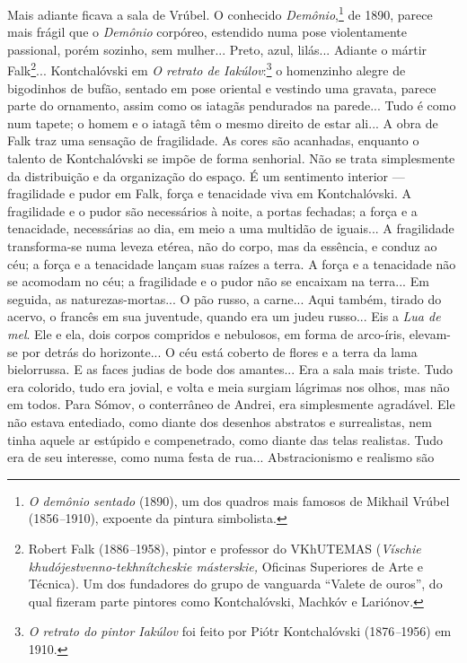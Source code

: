 Mais adiante ficava a sala de Vrúbel. O conhecido
\emph{Demônio},\footnote{\emph{O demônio sentado} (1890), um dos quadros
  mais famosos de Mikhail Vrúbel (1856\emph{--}1910), expoente da
  pintura simbolista.} de 1890, parece mais frágil que o \emph{Demônio}
corpóreo, estendido numa pose violentamente passional, porém sozinho,
sem mulher... Preto, azul, lilás... Adiante o mártir Falk\footnote{Robert
  Falk (1886\emph{--}1958), pintor e professor do VKhUTEMAS
  (\emph{Víschie khudójestvenno-tekhnítcheskie másterskie,} Oficinas
  Superiores de Arte e Técnica). Um dos fundadores do grupo de vanguarda
  ``Valete de ouros'', do qual fizeram parte pintores como
  Kontchalóvski, Machkóv e Lariónov.}... Kontchalóvski em \emph{O
retrato de Iakúlov}:\footnote{\emph{O retrato do pintor Iakúlov} foi
  feito por Piótr Kontchalóvski (1876\emph{--}1956) em 1910.} o
homenzinho alegre de bigodinhos de bufão, sentado em pose oriental e
vestindo uma gravata, parece parte do ornamento, assim como os iatagãs
pendurados na parede... Tudo é como num tapete; o homem e o iatagã têm o
mesmo direito de estar ali... A obra de Falk traz uma sensação de
fragilidade. As cores são acanhadas, enquanto o talento de Kontchalóvski
se impõe de forma senhorial. Não se trata simplesmente da distribuição e
da organização do espaço. É um sentimento interior --- fragilidade e
pudor em Falk, força e tenacidade viva em Kontchalóvski. A fragilidade e
o pudor são necessários à noite, a portas fechadas; a força e a
tenacidade, necessárias ao dia, em meio a uma multidão de iguais... A
fragilidade transforma-se numa leveza etérea, não do corpo, mas da
essência, e conduz ao céu; a força e a tenacidade lançam suas raízes a
terra. A força e a tenacidade não se acomodam no céu; a fragilidade e o
pudor não se encaixam na terra... Em seguida, as naturezas-mortas... O
pão russo, a carne... Aqui também, tirado do acervo, o francês em sua
juventude, quando era um judeu russo... Eis a \emph{Lua de mel}. Ele e
ela, dois corpos compridos e nebulosos, em forma de arco-íris, elevam-se
por detrás do horizonte... O céu está coberto de flores e a terra da
lama bielorrussa. E as faces judias de bode dos amantes... Era a sala
mais triste. Tudo era colorido, tudo era jovial, e volta e meia surgiam
lágrimas nos olhos, mas não em todos. Para Sómov, o conterrâneo de
Andrei, era simplesmente agradável. Ele não estava entediado, como
diante dos desenhos abstratos e surrealistas, nem tinha aquele ar
estúpido e compenetrado, como diante das telas realistas. Tudo era de
seu interesse, como numa festa de rua... Abstracionismo e realismo são
